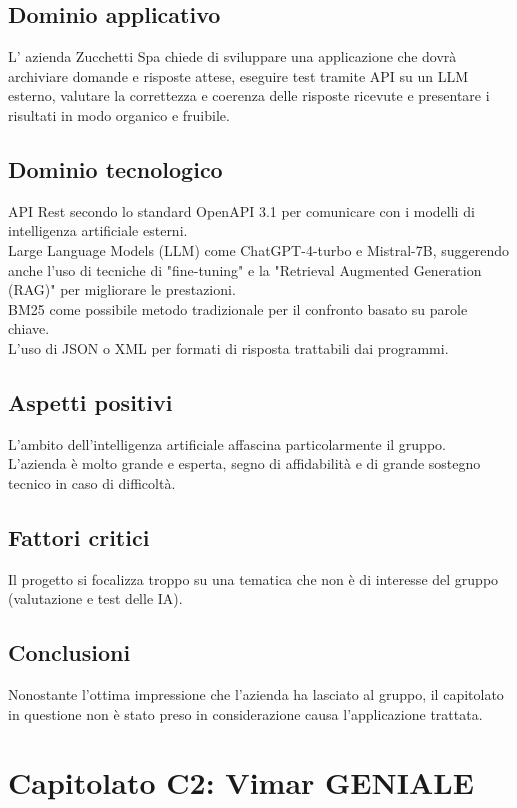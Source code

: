 \documentclass[italian, 12pt]{article}
\begin{document}
\subsection{Dominio applicativo}
L’ azienda Zucchetti Spa chiede di sviluppare una applicazione che dovrà archiviare domande e risposte attese, eseguire test tramite API su un LLM esterno, valutare la correttezza e coerenza delle risposte ricevute e presentare i risultati in modo organico e fruibile.

\subsection{Dominio tecnologico}
API Rest secondo lo standard OpenAPI 3.1 per comunicare con i modelli di intelligenza artificiale esterni.\\
Large Language Models (LLM) come ChatGPT-4-turbo e Mistral-7B, suggerendo anche l'uso di tecniche di "fine-tuning" e la "Retrieval Augmented Generation (RAG)" per migliorare le prestazioni.\\
BM25 come possibile metodo tradizionale per il confronto basato su parole chiave.\\
L'uso di JSON o XML per formati di risposta trattabili dai programmi.

\subsection{Aspetti positivi} 
L’ambito dell’intelligenza artificiale affascina particolarmente il gruppo.\\
L’azienda è molto grande e esperta, segno di affidabilità e di grande sostegno tecnico in caso di difficoltà.

\subsection{Fattori critici}
Il progetto si focalizza troppo su una tematica che non è di interesse del gruppo (valutazione e test delle IA).

\subsection{Conclusioni}
Nonostante l’ottima impressione che l’azienda ha lasciato al gruppo, il capitolato in questione non è stato preso in considerazione causa l’applicazione trattata.

\section{Capitolato C2: Vimar GENIALE}
\end{document}
